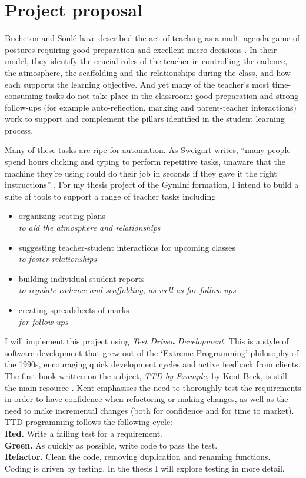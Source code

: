 \documentclass[10pt]{article}
\begin{document}
\section{Project proposal}

Bucheton and Soulé have described the act of teaching as a multi-agenda game of postures requiring good preparation and excellent micro-decisions \cite{BS09}. In their model, they identify the crucial roles of the teacher in controlling the cadence, the atmosphere, the scaffolding and the relationships during the class, and how each supports the learning objective. And yet many of the teacher's most time-consuming tasks do not take place in the classroom: good preparation and strong follow-ups (for example auto-reflection, marking and parent-teacher interactions) work to support and complement the pillars identified in the student learning process.

Many of these tasks are ripe for automation. As Sweigart writes, ``many people spend hours clicking and typing to perform repetitive tasks, unaware that the machine they’re using could do their job in seconds if they gave it the right instructions'' \cite{Swei15}.  For my thesis project of the GymInf formation, I intend to build a suite of tools to support a range of teacher tasks including 
\begin{itemize} 
\item organizing seating plans \\
\emph{to aid the atmosphere and relationships} 
\item suggesting teacher-student interactions for upcoming classes \\
\emph{to foster relationships}
\item building individual student reports \\
\emph{to regulate cadence and scaffolding, as well as for follow-ups}
\item creating spreadsheets of marks \\
\emph{for follow-ups}
\end{itemize}

I will implement this project using \emph{Test Driven Development.} This is a style of software development that grew out of the `Extreme Programming' philosophy of the 1990s, encouraging quick development cycles and active feedback from clients. The first book written on the subject, \emph{TTD by Example}, by Kent Beck, is still the main resource \cite{Beck03}. Kent emphasises the need to thoroughly test the requirements in order to have confidence when refactoring or making changes, as well as the need to make incremental changes (both for confidence and for time to market). TTD programming follows the following cycle: \\
\indent \textbf{Red.} Write a failing test for a requirement. \\
\indent \textbf{Green.} As quickly as possible, write code to pass the test. \\
\indent \textbf{Refactor.} Clean the code, removing duplication and renaming functions. \\
Coding is driven by testing. In the thesis I will explore testing in more detail.
\end{document}
